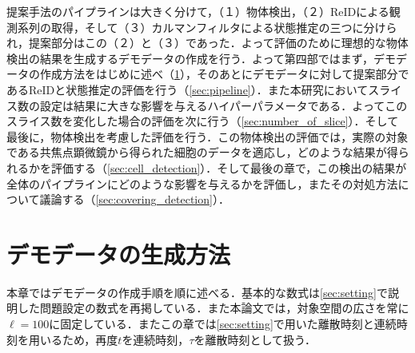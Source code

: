 \thispagestyle{fancy2}

提案手法のパイプラインは大きく分けて，（１）物体検出，（２）ReIDによる観測系列の取得，そして（３）カルマンフィルタによる状態推定の三つに分けられ，提案部分はこの（２）と（３）であった．よって評価のために理想的な物体検出の結果を生成するデモデータの作成を行う．よって第四部ではまず，デモデータの作成方法をはじめに述べ（\ref{sec:demodata}），そのあとにデモデータに対して提案部分であるReIDと状態推定の評価を行う（\ref{sec:pipeline}）．また本研究においてスライス数の設定は結果に大きな影響を与えるハイパーパラメータである．よってこのスライス数を変化した場合の評価を次に行う（\ref{sec:number_of_slice}）．そして最後に，物体検出を考慮した評価を行う．この物体検出の評価では，実際の対象である共焦点顕微鏡から得られた細胞のデータを適応し，どのような結果が得られるかを評価する（\ref{sec:cell_detection}）．そして最後の章で，この検出の結果が全体のパイプラインにどのような影響を与えるかを評価し，またその対処方法について議論する（\ref{sec:covering_detection}）．

\section{デモデータの生成方法}
\label{sec:demodata}

本章ではデモデータの作成手順を順に述べる．基本的な数式は\ref{sec:setting}で説明した問題設定の数式を再掲している．また本論文では，対象空間の広さを常に$\ell = 100$に固定している．またこの章では\ref{sec:setting}で用いた離散時刻と連続時刻を用いるため，再度$t$を連続時刻，$\tau$を離散時刻として扱う．

